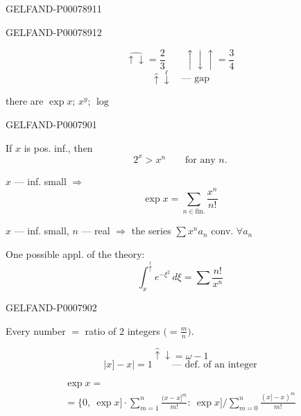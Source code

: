 \begin{GelfandAdjacentEvidence}{GELFAND-P000789}{11}

\end{GelfandAdjacentEvidence}
\begin{GelfandAdjacentEvidence}{GELFAND-P000789}{12}


\[
\widehat{\uparrow\downarrow}=\frac23\qquad\uparrow\downarrow\uparrow=\frac34
\]
\[
\widehat{\uparrow}\overset{\ell}{\downarrow}\quad\text{--- gap}
\]
\end{GelfandAdjacentEvidence}


there are \(\exp x\); \(x^y\); \(\log\)


\begin{GelfandAdjacentEvidence}{GELFAND-P000790}{1}

If \(x\) is pos. inf., then
\[
2^x>x^n\qquad\text{for any }n.
\]

\(x\) --- inf. small \(\Rightarrow\)
\[
\exp x=\sum_{n\in\text{fin.}}\frac{x^n}{n!}
\]

\(x\) --- inf. small, \(n\) --- real \(\Rightarrow\) the series
\(\sum x^n a_n\) conv. \(\forall a_n\)

One possible appl. of the theory:
\[
\int_x^{\overset{\ell}{\uparrow}}e^{-\xi^2}\,d\xi
=\sum\frac{n!}{x^n}
\]
\end{GelfandAdjacentEvidence}
\begin{GelfandAdjacentEvidence}{GELFAND-P000790}{2}


Every number \(=\) ratio of 2 integers \(\bigl(=\frac mn\bigr)\).

\[
\widehat{\uparrow}\downarrow=\omega-1
\]
\[
\lvert x]-x\rvert=1\qquad\text{--- def. of an integer}
\]

\begin{gather*}
\exp x=\\
=\bigl\{0,\ \exp x]\cdot\sum_{m=1}^{n}\frac{(x-x]^{m}}{m!}
:\ \exp x]\bigg/\sum_{m=0}^{n}\frac{(x]-x)^m}{m!}
\end{gather*}
\end{GelfandAdjacentEvidence}




